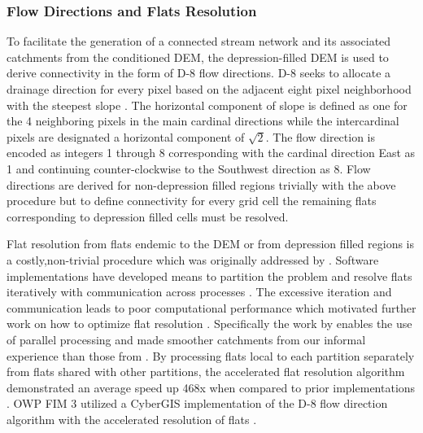 \subsubsection{Flow Directions and Flats Resolution}
\label{ssec:flow_direction_and_flat_resolution}
%
To facilitate the generation of a connected stream network and its associated catchments from the conditioned DEM, the depression-filled DEM is used to derive connectivity in the form of D-8 flow directions.
D-8 seeks to allocate a drainage direction for every pixel based on the adjacent eight pixel neighborhood with the steepest slope \cite{o1984extraction}.
The horizontal component of slope is defined as one for the 4 neighboring pixels in the main cardinal directions while the intercardinal pixels are designated a horizontal component of $\sqrt{2}$. 
The flow direction is encoded as integers 1 through 8 corresponding with the cardinal direction East as 1 and continuing counter-clockwise to the Southwest direction as 8. 
Flow directions are derived for non-depression filled regions trivially with the above procedure but to define connectivity for every grid cell the remaining flats corresponding to depression filled cells must be resolved.

Flat resolution from flats endemic to the DEM or from depression filled regions is a costly,non-trivial procedure which was originally addressed by .  
Software implementations have developed means to partition the problem and resolve flats iteratively with communication across processes \cite{tarboton2009generalized,tesfa2011extraction,wallis2009parallel,tarboton2005terrain}.
The excessive iteration and communication leads to poor computational performance which motivated further work on how to optimize flat resolution \cite{survila2016scalable,barnes2014efficient}.
Specifically the work by  enables the use of parallel processing and made smoother catchments from our informal experience than those from .
By processing flats local to each partition separately from flats shared with other partitions, the accelerated flat resolution algorithm demonstrated an average speed up 468x when compared to prior implementations \cite{survila2016scalable}.
OWP FIM 3 utilized a CyberGIS implementation of the D-8 flow direction algorithm with the accelerated resolution of flats \cite{survila2016scalable,cybergis2016}.
%

